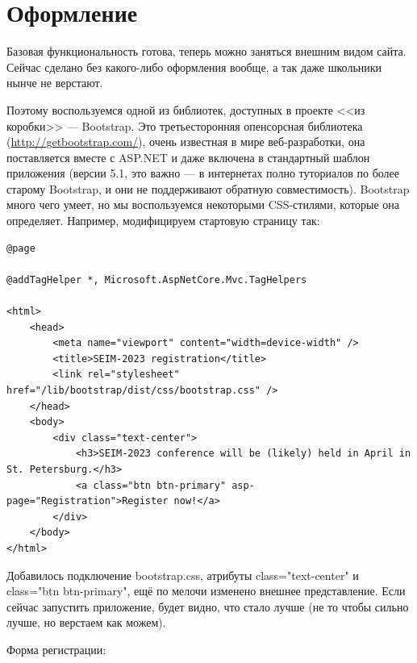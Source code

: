 \documentclass{../../text-style}
\begin{document}
\section{Оформление}

Базовая функциональность готова, теперь можно заняться внешним видом сайта. Сейчас сделано без какого-либо оформления вообще, а так даже школьники нынче не верстают. 

Поэтому воспользуемся одной из библиотек, доступных в проекте <<из коробки>> --- Bootstrap. Это третьесторонняя опенсорсная библиотека 
(\url{http://getbootstrap.com/}), очень известная в мире веб-разработки, она поставляется вместе с ASP.NET и даже включена в стандартный шаблон приложения (версии 5.1, это важно --- в интернетах полно туториалов по более старому Bootstrap, и они не поддерживают обратную совместимость). Bootstrap много чего умеет, но мы воспользуемся некоторыми CSS-стилями, которые она определяет. Например, модифицируем
стартовую страницу так:

\begin{verbatim}
@page

@addTagHelper *, Microsoft.AspNetCore.Mvc.TagHelpers

<html>
    <head>
        <meta name="viewport" content="width=device-width" />
        <title>SEIM-2023 registration</title>
        <link rel="stylesheet" href="/lib/bootstrap/dist/css/bootstrap.css" />
    </head>
    <body>
        <div class="text-center">
            <h3>SEIM-2023 conference will be (likely) held in April in St. Petersburg.</h3>
            <a class="btn btn-primary" asp-page="Registration">Register now!</a>
        </div>
    </body>
</html>
\end{verbatim}

Добавилось подключение bootstrap.css, атрибуты class="text-center" и class="btn btn-primary", ещё по мелочи изменено внешнее представление. Если сейчас запустить приложение, будет видно, что стало лучше (не то чтобы сильно лучше, но верстаем как можем).

Форма регистрации:
\end{document}
